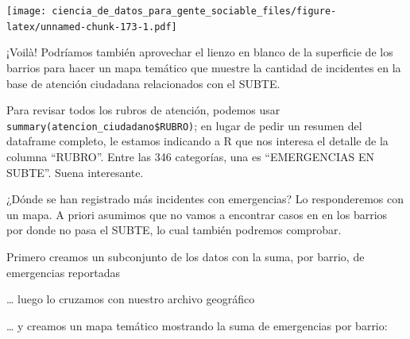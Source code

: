\documentclass[spanish,]{book}
\newenvironment{Shaded}{\begin{snugshade}}{\end{snugshade}}
\newcommand{\DataTypeTok}[1]{\textcolor[rgb]{0.13,0.29,0.53}{#1}}
\newcommand{\KeywordTok}[1]{\textcolor[rgb]{0.13,0.29,0.53}{\textbf{#1}}}
\newcommand{\NormalTok}[1]{#1}
\newcommand{\OperatorTok}[1]{\textcolor[rgb]{0.81,0.36,0.00}{\textbf{#1}}}
\newcommand{\StringTok}[1]{\textcolor[rgb]{0.31,0.60,0.02}{#1}}
\begin{document}
\texttt{[image: ciencia\_de\_datos\_para\_gente\_sociable\_files/figure-latex/unnamed-chunk-173-1.pdf]}

¡Voilà! Podríamos también aprovechar el lienzo en blanco de la superficie de los barrios para hacer un mapa temático que muestre la cantidad de incidentes en la base de atención ciudadana relacionados con el SUBTE.

Para revisar todos los rubros de atención, podemos usar \texttt{summary(atencion\_ciudadano\$RUBRO)}; en lugar de pedir un resumen del dataframe completo, le estamos indicando a R que nos interesa el detalle de la columna ``RUBRO''. Entre las 346 categorías, una es ``EMERGENCIAS EN SUBTE''. Suena interesante.

¿Dónde se han registrado más incidentes con emergencias? Lo responderemos con un mapa. A priori asumimos que no vamos a encontrar casos en en los barrios por donde no pasa el SUBTE, lo cual también podremos comprobar.

Primero creamos un subconjunto de los datos con la suma, por barrio, de emergencias reportadas

\begin{Shaded}
\end{Shaded}

\ldots{} luego lo cruzamos con nuestro archivo geográfico

\begin{Shaded}
\end{Shaded}

\ldots{} y creamos un mapa temático mostrando la suma de emergencias por barrio:
\end{document}

